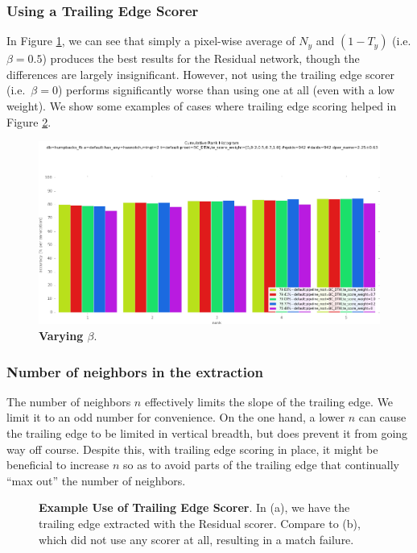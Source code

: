 \subsubsection{Using a Trailing Edge Scorer}

In Figure \ref{fig:vary_te_weight}, we can see that simply a pixel-wise average of $N_y$ and $(1-T_y)$ (i.e. $\beta = 0.5$) produces the best results for the Residual network, though the differences are largely insignificant.
However, not using the trailing edge scorer (i.e.\ $\beta = 0$) performs significantly worse than using one at all (even with a low weight).
We show some examples of cases where trailing edge scoring helped in Figure \ref{fig:dis_te_use}.

\begin{figure}[t]%
\centering
\includegraphics[width=1\textwidth]{../images/results/vary_te_weight.png}
\caption{\textbf{Varying $\beta$}.}
\label{fig:vary_te_weight}
\end{figure}


\subsubsection{Number of neighbors in the extraction}

The number of neighbors $n$ effectively limits the slope of the trailing edge.
We limit it to an odd number for convenience.
On the one hand, a lower $n$ can cause the trailing edge to be limited in vertical breadth, but does prevent it from going way off course.
Despite this, with trailing edge scoring in place, it might be beneficial to increase $n$ so as to avoid parts of the trailing edge that continually ``max out'' the number of neighbors.

\begin{figure}[t]%
\centering
{}
\newline
{}
\caption{\textbf{Example Use of Trailing Edge Scorer}. In (a), we have the trailing edge extracted with the Residual scorer. Compare to (b), which did not use any scorer at all, resulting in a match failure.}
\label{fig:dis_te_use}
\end{figure}

